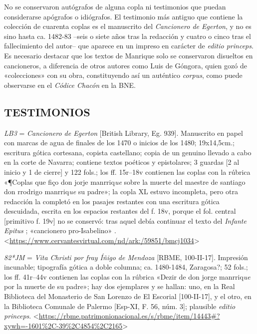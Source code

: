 \documentclass[11pt,a4paper,twoside]{article}
\newcommand{\comillas}[1]{«#1»}
\begin{document}
%
No se conservaron autógrafos de alguna copla ni testimonios que puedan considerarse apógrafos o idiógrafos. El testimonio más antiguo que contiene la colección de cuarenta coplas es el manuscrito del \emph{Cancionero de Egerton}, y no es sino hasta ca. 1482-83 --seis o siete años tras la redacción y cuatro o cinco tras el fallecimiento del autor-- que aparece en un impreso en carácter de \emph{editio princeps}. Es necesario destacar que los textos de Manrique solo se conservaron disueltos en cancioneros, a diferencia de otros autores como Luis de Góngora, quien gozó de \comillas{colecciones} con su obra, constituyendo así un auténtico \emph{corpus}, como puede observarse en el \emph{Códice Chacón} en la BNE.\par

\subsection*{\centering\fontsize{11}{14}\selectfont TESTIMONIOS}

\emph{LB3} = \emph{Cancionero de Egerton} [British Library, Eg. 939].
%
Manuscrito en papel con marcas de agua de finales de los 1470 o inicios de los 1480; 19x14,5cm.; escritura gótica cortesana, copista castellano; copia de un genuino llevado a cabo en la corte de Navarra; contiene textos poéticos y epistolares; 3 guardas [2 al inicio y 1 de cierre] y 122 fols.; los ff. 15r--18v contienen las coplas con la rúbrica \comillas{¶Coplas que fiço don jorje manrriq\emph{ue} sobre la muerte del maestre de santiago don rrodrigo manrriq\emph{ue} su padre}; la copla XL estuvo incompleta, pero otra redacción la completó en los pasajes restantes con una escritura gótica descuidada, escrita en los espacios restantes del f. 18v, porque el fol. central [primitivo f. 19v] no se conservó: tras aquel debía continuar el texto del \emph{Infante Epitus} \textcite{Beltrán2011}; \comillas{cancionero pro-Isabelino} \parencite{Severin2000}. <\url{https://www.cervantesvirtual.com/nd/ark:/59851/bmcj1034}>\par

\emph{82*JM} = \emph{Vita Christi por fray Íñigo de Mendoza} [RBME, 100-II-17].
%
Impresión incunable; tipografía gótica a doble columna; ca. 1480-1484, Zaragosa?; 52 fols.; los ff. 41r--44v contienen las coplas con la rúbrica \comillas{Dezir de don jorge manrriq\emph{ue} por la muerte de su padre}; hay dos ejemplares y se hallan: uno, en la Real Biblioteca del Monasterio de San Lorenzo de El Escorial [100-II-17], y el otro, en la Biblioteca Comunale de Palermo [Esp-XI, F. 56, núm. 3]; plausible \emph{editio princeps}. <\url{https://rbme.patrimonionacional.es/s/rbme/item/14443#?xywh=-1601%2C-39%2C4854%2C2165}>\par
\end{document}
